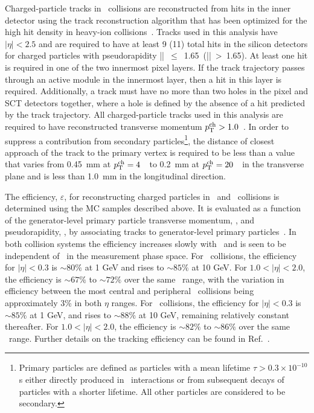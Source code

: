 Charged-particle tracks in \pbpb\ collisions are reconstructed from hits in the inner detector using the track reconstruction algorithm that has been optimized for the high hit density in heavy-ion collisions~\cite{Aaboud:2017all}.
Tracks used in this analysis have $|\eta| < 2.5$ and are required to have at least 9 (11) total hits in the silicon detectors for charged particles with pseudorapidity \mbox{|\etatrk| $\leq$ 1.65 (|\etatrk| > 1.65)}.
At least one hit is required in one of the two innermost pixel layers.
If the track trajectory passes through an active module in the innermost layer, then a hit in this layer is required.
Additionally, a track must have no more than two holes in the pixel and SCT detectors together, where a hole is defined by the absence of a hit predicted by the track trajectory.
All charged-particle tracks used in this analysis are required to have reconstructed transverse momentum $\mbox{$p_{\mathrm{T}}^{\mathrm{ch}}$} > 1.0 $~\GeV.
In order to suppress a contribution from secondary particles\footnote{Primary particles are defined as particles with a mean lifetime $\tau>0.3\times 10^{-10}$ s either directly produced in \pp\ interactions or from subsequent decays of particles with a shorter lifetime.
All other particles are considered to be secondary.}, the distance of closest approach of the track to the primary vertex is required to be less than a value that varies from 0.45~mm at $\mbox{$p_{\mathrm{T}}^{\mathrm{ch}}$}=4$~\GeV\ to 0.2~mm at $\mbox{$p_{\mathrm{T}}^{\mathrm{ch}}$}=20$~\GeV\ in the transverse plane and is less than 1.0~mm in the longitudinal direction.


The efficiency, $\varepsilon$, for reconstructing charged particles in \PbPb\ and \pp\ collisions is determined using the MC samples described above.
It is evaluated as a function of the generator-level primary particle transverse momentum, \pTtrue, and pseudorapidity, \etatrue, by associating tracks to generator-level primary particles~\cite{Aad:2010ah}.
In both collision systems the efficiency increases slowly with \pTtrue\ and is seen to be independent of \ptjet\ in the measurement phase space.
For \pbpb\ collisions, the efficiency for $|\eta| < 0.3$  is $\sim 80\%$ at 1 GeV and rises to $\sim 85\%$ at 10 GeV.
For $1.0 < |\eta| < 2.0$, the efficiency is $\sim 67\%$ to $\sim 72\%$  over the same \pt\ range, with the variation in efficiency between the most central and peripheral \pbpb\ collisions being approximately 3\% in both $\eta$ ranges.
For \pp\ collisions, the efficiency for $|\eta| < 0.3$ is $\sim85\%$ at 1 GeV, and rises to $\sim 88 \%$ at 10 GeV, remaining relatively constant thereafter.
For $1.0 < |\eta| < 2.0$, the efficiency is $\sim 82\%$ to $\sim 86\%$ over the same \pt\ range.
Further details on the tracking efficiency can be found in Ref.~\cite{Aaboud:2017bzv}.

